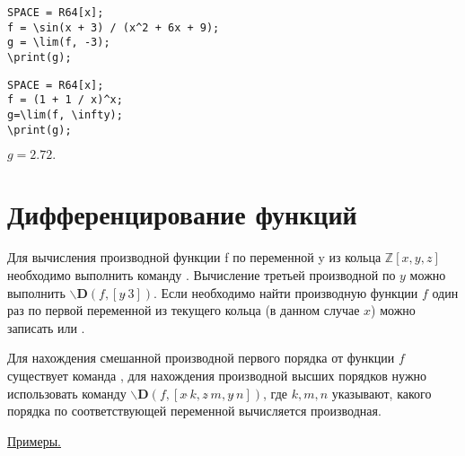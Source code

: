 \begin{verbatim}
SPACE = R64[x];
f = \sin(x + 3) / (x^2 + 6x + 9);
g = \lim(f, -3);
\print(g);
\end{verbatim}
\vspace*{-3mm}


\begin{verbatim}
SPACE = R64[x];
f = (1 + 1 / x)^x;
g=\lim(f, \infty);
\print(g);
\end{verbatim}
\vspace*{-3mm}

{$g = 2. 72. $}

\section{Дифференцирование функций}
Для вычисления производной функции f по переменной y из кольца $\mathbb{Z}[x, y, z]$
 необходимо выполнить команду .  Вычисление третьей производной по $y$ можно выполнить
 $\backslash {\mathbf {D}} (f, [y\widehat{\ }{}3]) $. 
Если необходимо найти производную функции $f$ один раз
 по первой переменной из текущего кольца (в данном случае $x$) можно записать   или  . 

 Для нахождения смешанной производной первого порядка от функции $f$ существует команда ,  для нахождения производной высших порядков нужно использовать команду  $\backslash {\mathbf {D}} (f, [x \widehat{\ }{} k, z \widehat{\ }{} m, y \widehat{\ }{} n])$,  где $k,  m,  n$ указывают,  какого порядка по соответствующей переменной вычисляется производная. 

\smallskip

\underline{Примеры. }

